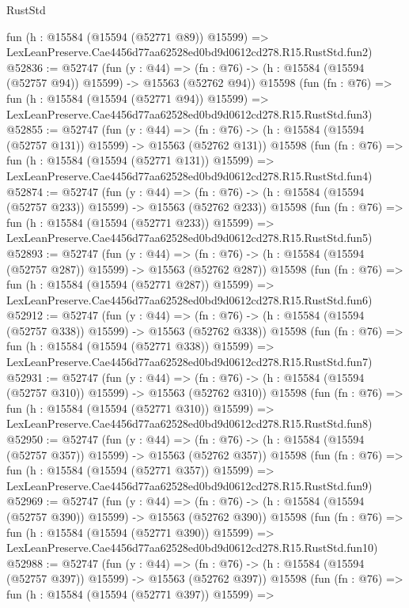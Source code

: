 \begin{lexlean}{RustStd}
\begin{coremodule}
    fun (h : @15584 (@15594 (@52771 @89)) @15599) =>
    LexLeanPreserve.Cae4456d77aa62528ed0bd9d0612cd278.R15.RustStd.fun2)
@52836 := @52747
    (fun (y : @44) =>
    (fn : @76) -> (h : @15584 (@15594 (@52757 @94)) @15599) -> @15563 (@52762 @94))
    @15598
    (fun (fn : @76) =>
    fun (h : @15584 (@15594 (@52771 @94)) @15599) =>
    LexLeanPreserve.Cae4456d77aa62528ed0bd9d0612cd278.R15.RustStd.fun3)
@52855 := @52747
    (fun (y : @44) =>
    (fn : @76) -> (h : @15584 (@15594 (@52757 @131)) @15599) -> @15563 (@52762 @131))
    @15598
    (fun (fn : @76) =>
    fun (h : @15584 (@15594 (@52771 @131)) @15599) =>
    LexLeanPreserve.Cae4456d77aa62528ed0bd9d0612cd278.R15.RustStd.fun4)
@52874 := @52747
    (fun (y : @44) =>
    (fn : @76) -> (h : @15584 (@15594 (@52757 @233)) @15599) -> @15563 (@52762 @233))
    @15598
    (fun (fn : @76) =>
    fun (h : @15584 (@15594 (@52771 @233)) @15599) =>
    LexLeanPreserve.Cae4456d77aa62528ed0bd9d0612cd278.R15.RustStd.fun5)
@52893 := @52747
    (fun (y : @44) =>
    (fn : @76) -> (h : @15584 (@15594 (@52757 @287)) @15599) -> @15563 (@52762 @287))
    @15598
    (fun (fn : @76) =>
    fun (h : @15584 (@15594 (@52771 @287)) @15599) =>
    LexLeanPreserve.Cae4456d77aa62528ed0bd9d0612cd278.R15.RustStd.fun6)
@52912 := @52747
    (fun (y : @44) =>
    (fn : @76) -> (h : @15584 (@15594 (@52757 @338)) @15599) -> @15563 (@52762 @338))
    @15598
    (fun (fn : @76) =>
    fun (h : @15584 (@15594 (@52771 @338)) @15599) =>
    LexLeanPreserve.Cae4456d77aa62528ed0bd9d0612cd278.R15.RustStd.fun7)
@52931 := @52747
    (fun (y : @44) =>
    (fn : @76) -> (h : @15584 (@15594 (@52757 @310)) @15599) -> @15563 (@52762 @310))
    @15598
    (fun (fn : @76) =>
    fun (h : @15584 (@15594 (@52771 @310)) @15599) =>
    LexLeanPreserve.Cae4456d77aa62528ed0bd9d0612cd278.R15.RustStd.fun8)
@52950 := @52747
    (fun (y : @44) =>
    (fn : @76) -> (h : @15584 (@15594 (@52757 @357)) @15599) -> @15563 (@52762 @357))
    @15598
    (fun (fn : @76) =>
    fun (h : @15584 (@15594 (@52771 @357)) @15599) =>
    LexLeanPreserve.Cae4456d77aa62528ed0bd9d0612cd278.R15.RustStd.fun9)
@52969 := @52747
    (fun (y : @44) =>
    (fn : @76) -> (h : @15584 (@15594 (@52757 @390)) @15599) -> @15563 (@52762 @390))
    @15598
    (fun (fn : @76) =>
    fun (h : @15584 (@15594 (@52771 @390)) @15599) =>
    LexLeanPreserve.Cae4456d77aa62528ed0bd9d0612cd278.R15.RustStd.fun10)
@52988 := @52747
    (fun (y : @44) =>
    (fn : @76) -> (h : @15584 (@15594 (@52757 @397)) @15599) -> @15563 (@52762 @397))
    @15598
    (fun (fn : @76) =>
    fun (h : @15584 (@15594 (@52771 @397)) @15599) =>

\end{coremodule}
\end{lexlean}
